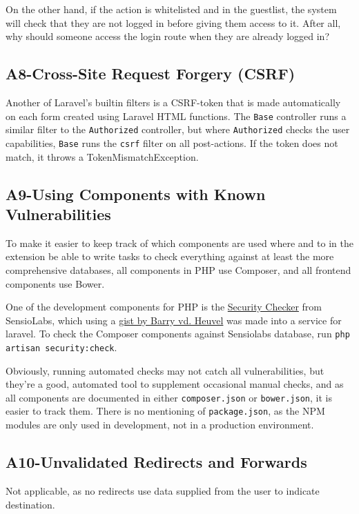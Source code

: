 On the other hand, if the action is whitelisted and in the guestlist,
the system will check that they are not logged in before giving them
access to it. After all, why should someone access the login route when
they are already logged in?

\subsection{A8-Cross-Site Request Forgery (CSRF)}

Another of Laravel's builtin filters is a CSRF-token that is made
automatically on each form created using Laravel HTML functions. The
\texttt{Base} controller runs a similar filter to the
\texttt{Authorized} controller, but where \texttt{Authorized} checks the
user capabilities, \texttt{Base} runs the \texttt{csrf} filter on all
post-actions. If the token does not match, it throws a
TokenMismatchException.

\subsection{A9-Using Components with Known Vulnerabilities}

To make it easier to keep track of which components are used where and
to in the extension be able to write tasks to check everything against
at least the more comprehensive databases, all components in PHP use
Composer, and all frontend components use Bower.

One of the development components for PHP is the
\href{https://packagist.org/packages/sensiolabs/security-checker}{Security
Checker} from SensioLabs, which using a
\href{https://gist.github.com/barryvdh/6696739}{gist by Barry vd.
Heuvel} was made into a service for laravel. To check the Composer
components against Sensiolabs database, run
\texttt{php artisan security:check}.

Obviously, running automated checks may not catch all vulnerabilities,
but they're a good, automated tool to supplement occasional manual
checks, and as all components are documented in either
\texttt{composer.json} or \texttt{bower.json}, it is easier to track
them. There is no mentioning of \texttt{package.json}, as the NPM
modules are only used in development, not in a production environment.

\subsection{A10-Unvalidated Redirects and Forwards}

Not applicable, as no redirects use data supplied from the user to
indicate destination.
